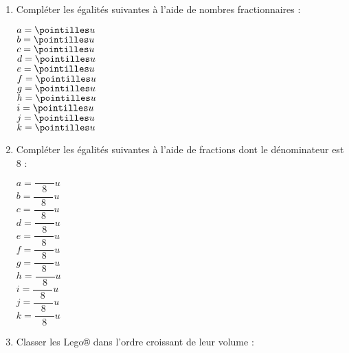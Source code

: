 \begin{activite}
\begin{changemargin}{-10mm}{-15mm}
            \begin{enumerate}
                \item Compléter les égalités suivantes à l'aide de nombres fractionnaires : \\ [-3mm]
                \begin{multicols}{6}
                    $a = \pointilles u$ \\ [7mm]
                    $b = \pointilles u$ \\ [7mm]
                    $c = \pointilles u$ \\ [7mm]
                    $d = \pointilles u$ \\ [7mm]
                    $e = \pointilles u$ \\ [7mm]
                    $f = \pointilles u$ \\ [7mm]
                    $g = \pointilles u$ \\ [7mm]
                    $h = \pointilles u$ \\ [7mm]
                    $i = \pointilles u$ \\ [7mm]
                    $j = \pointilles u$ \\ [7mm]
                    $k = \pointilles u$ \\ [7mm]
                \end{multicols} \medskip
                \item Compléter les égalités suivantes à l'aide de fractions dont le dénominateur est 8 : \\ [-3mm]
                \begin{multicols}{6}
                    $a = \dfrac{\qquad}{8} u$ \\ [7mm]
                    $b = \dfrac{\qquad}{8} u$ \\ [7mm]
                    $c = \dfrac{\qquad}{8} u$ \\ [7mm]
                    $d = \dfrac{\qquad}{8} u$ \\ [7mm]
                    $e = \dfrac{\qquad}{8} u$ \\ [7mm]
                    $f = \dfrac{\qquad}{8} u$ \\ [7mm]
                    $g = \dfrac{\qquad}{8} u$ \\ [7mm]
                    $h = \dfrac{\qquad}{8} u$ \\ [7mm]
                    $i = \dfrac{\qquad}{8} u$ \\ [7mm]
                    $j = \dfrac{\qquad}{8} u$ \\ [7mm]
                    $k = \dfrac{\qquad}{8} u$ \\ [7mm]
                \end{multicols}
                \item Classer les Lego® dans l'ordre croissant de leur volume : \par \medskip
                \pointilles
        \end{enumerate}
    \end{changemargin}
    \vspace*{-50mm}
\end{activite}